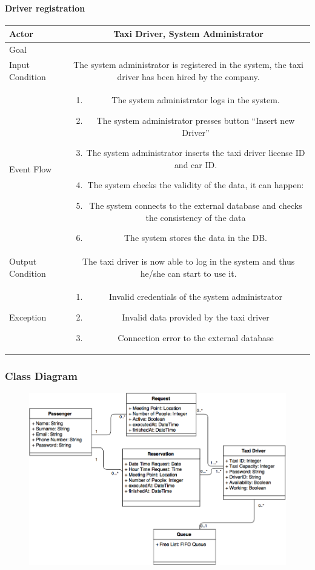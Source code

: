\documentclass[a4paper,12pt,dvipsnames]{article}%
\newcommand{\usecasetable}[6]{
\begin{center}
\def\arraystretch{1.5}
\begin{tabularx}{\textwidth}{|s|C|}
\hline
Actor & #1\\
\hline
Goal & #2\\
\hline
Input Condition & #3 \\
\hline
Event Flow & #4\\
\hline
Output Condition & #5\\
\hline
Exception & #6\\
\hline
\end{tabularx}
\end{center}
}
\begin{document}
\paragraph{Driver registration}
\usecasetable{Taxi Driver, System Administrator}{}{The system administrator is registered in the system, the taxi driver has been hired by the company.}
{
\begin{minipage}[b]{11cm}
\begin{enumerate}
\item The system administrator logs in the system.
\item The system administrator presses button ``Insert new Driver''
\item The system administrator inserts the taxi driver license ID and car ID.
\item The system checks the validity of the data, it can happen:
\item The system connects to the external database and checks the consistency of the data
\item The system stores the data in the DB.
\end{enumerate}
\end{minipage}
}
{The taxi driver is now able to log in the system and thus he/she can start to use it.}
{
\begin{minipage}[b]{11cm}
\begin{enumerate}
\item Invalid credentials of the system administrator
\item Invalid data provided by the taxi driver
\item Connection error to the external database
\end{enumerate}
\end{minipage}
}
\begin{landscape}
\subsubsection{Class Diagram}
\begin{figure}[H]
\includegraphics[scale=.7]{class_diagram.png}
\end{figure}
\end{landscape}
\break
\end{document}
